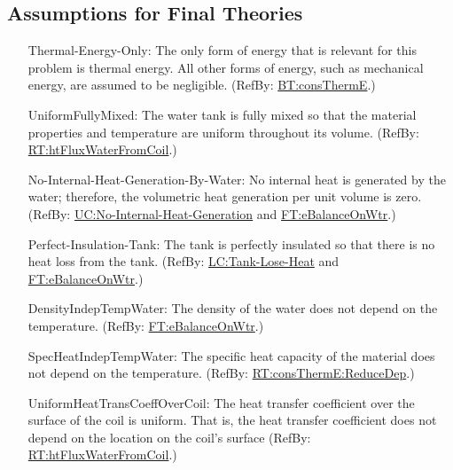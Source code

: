 \documentclass[12pt]{article}
\begin{document}
\subsection{Assumptions for Final Theories}

\begin{itemize}

\item[Thermal-Energy-Only:\phantomsection\label{assumpTEO}]{The only form of
energy that is relevant for this problem is thermal energy. All other forms of
energy, such as mechanical energy, are assumed to be negligible. (RefBy:
\hyperref[BT:consThermE]{BT:consThermE}.)}
                
\item[UniformFullyMixed:\phantomsection\label{assumpFullyMixed}]
{The water tank is fully mixed so that the material properties and temperature
are uniform throughout its volume. (RefBy:
\hyperref[RT:htFluxWaterFromCoil]{RT:htFluxWaterFromCoil}.)}

\item[No-Internal-Heat-Generation-By-Water:\phantomsection\label{assumpNIHGBW}]{No
internal heat is generated by the water; therefore, the volumetric heat
generation per unit volume is zero. (RefBy:
\hyperref[unlikeChgNIHG]{UC:No-Internal-Heat-Generation} and
\hyperref[FT:eBalanceOnWtr]{FT:eBalanceOnWtr}.)}

\item[Perfect-Insulation-Tank:\phantomsection\label{assumpPIT}]{The tank is
perfectly insulated so that there is no heat loss from the tank. (RefBy:
\hyperref[likeChgTLH]{LC:Tank-Lose-Heat} and
\hyperref[FT:eBalanceOnWtr]{FT:eBalanceOnWtr}.)}

\item[DensityIndepTempWater:\phantomsection\label{assumpDensIndepTWater}]{The
density of the water does not depend on the temperature. (RefBy:
\hyperref[FT:eBalanceOnWtr]{FT:eBalanceOnWtr}.)}

\item[SpecHeatIndepTempWater:\phantomsection\label{assumpSpecHeatIndepTWater}]{The
specific heat capacity of the material does not depend on the temperature.
(RefBy: \hyperref[RT:consThermE:ReduceDep]{RT:consThermE:ReduceDep}.)}

\item[UniformHeatTransCoeffOverCoil:\phantomsection\label{assumpUnifHeatTransCoeffCoil}]
{The heat transfer coefficient over the surface of the coil is uniform.  That
is, the heat transfer coefficient does not depend on the location on the coil's
surface (RefBy: \hyperref[RT:htFluxWaterFromCoil]{RT:htFluxWaterFromCoil}.)}


\end{itemize}
\end{document}
